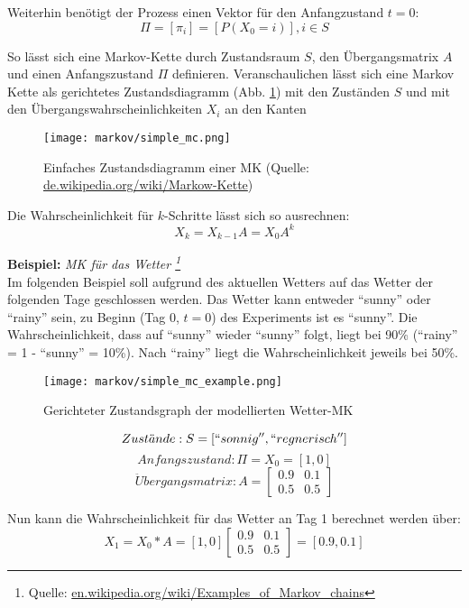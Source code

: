 Weiterhin benötigt der Prozess einen Vektor für den Anfangzustand \( t = 0 \):
\[ \Pi = [ \pi_i] = [ P (X_0 = i) ] , i \in S \]

So lässt sich eine Markov-Kette durch Zustandsraum \(S\), den Übergangsmatrix \( A \) und einen Anfangszustand \( \Pi \) definieren.
Veranschaulichen lässt sich eine Markov Kette als gerichtetes Zustandsdiagramm (Abb. \ref{fig:simple_mc}) mit den Zuständen \(S\) und 
mit den Übergangswahrscheinlichkeiten \(X_i\) an den Kanten
\begin{figure}[htbp] \centering
    \texttt{[image: markov/simple\_mc.png]}
    \caption{Einfaches Zustandsdiagramm einer \acl{MK} (Quelle: \url{de.wikipedia.org/wiki/Markow-Kette})}
    \label{fig:simple_mc}
\end{figure}

Die Wahrscheinlichkeit für \( k \)-Schritte lässt sich so ausrechnen: 
\[ X_k = X_{k-1} A = X_0 A^k \] 


\textbf{Beispiel:} 
\textit{ \acl{MK} für das Wetter \footnote{Quelle: \url{en.wikipedia.org/wiki/Examples_of_Markov_chains}}} \\
Im folgenden Beispiel soll aufgrund des aktuellen Wetters auf das Wetter der folgenden Tage geschlossen werden.
Das Wetter kann entweder ``sunny'' oder ``rainy'' sein, zu Beginn (Tag 0, \( t = 0 \)) des Experiments ist es ``sunny''.
Die Wahrscheinlichkeit, dass auf ``sunny'' wieder ``sunny'' folgt, liegt bei 90\% (``rainy'' = 1 - ``sunny'' = 10\%). 
Nach ``rainy'' liegt die Wahrscheinlichkeit jeweils bei 50\%.  
\begin{figure}[htbp] \centering
    \texttt{[image: markov/simple\_mc\_example.png]}
    \caption{ Gerichteter Zustandsgraph der modellierten Wetter-\acl{MK} }
    \label{fig:simple_mc_example}
\end{figure}


\[ Zust\ddot{a}nde: S = [``sonnig'', ``regnerisch''] \]
\[ Anfangszustand:  \Pi = X_0 = [1 , 0] \]
\[\ddot{U}bergangsmatrix: A = \begin {bmatrix} 0.9&0.1\\0.5&0.5 \end {bmatrix}
\]

Nun kann die Wahrscheinlichkeit für das Wetter an Tag 1 berechnet werden über: \\
\[ X_1 = X_0 * A = [ 1, 0 ] \begin {bmatrix} 0.9&0.1\\0.5&0.5 \end {bmatrix} = [ 0.9, 0.1] \]

